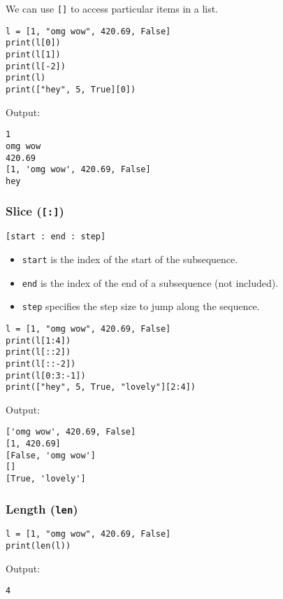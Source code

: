 \documentclass[11pt]{article}
\begin{document}
We can use \texttt{[]} to access particular items in a list.
\begin{verbatim}
l = [1, "omg wow", 420.69, False]
print(l[0])
print(l[1])
print(l[-2])
print(l)
print(["hey", 5, True][0])
\end{verbatim}

 \noindent Output:

\begin{verbatim}
1
omg wow
420.69
[1, 'omg wow', 420.69, False]
hey
\end{verbatim}


 \newpage

\subsubsection{Slice (\texttt{[:]})}
\label{sec:org923e11b}
\texttt{[start : end : step]}
\begin{itemize}
\item \texttt{start} is the index of the start of the subsequence.
\item \texttt{end} is the index of the end of a subsequence (not included).
\item \texttt{step} specifies the step size to jump along the sequence.
\end{itemize}

\begin{verbatim}
l = [1, "omg wow", 420.69, False]
print(l[1:4])
print(l[::2])
print(l[::-2])
print(l[0:3:-1])
print(["hey", 5, True, "lovely"][2:4])
\end{verbatim}

 \noindent Output:

\begin{verbatim}
['omg wow', 420.69, False]
[1, 420.69]
[False, 'omg wow']
[]
[True, 'lovely']
\end{verbatim}

\subsubsection{Length (\texttt{len})}
\label{sec:org187c216}
\begin{verbatim}
l = [1, "omg wow", 420.69, False]
print(len(l))
\end{verbatim}

 \noindent Output:

\begin{verbatim}
4
\end{verbatim}
\end{document}
